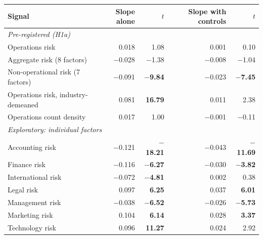 \begin{tabular}{lrrrr}
\toprule
Signal & Slope alone & $t$ & Slope with controls & $t$ \\
\midrule
\multicolumn{5}{l}{\textit{Pre-registered (H1a)}} \\
Operations risk & 0.018 & 1.08 & 0.001 & 0.10 \\
Aggregate risk (8 factors) & \ensuremath{-}0.028 & \ensuremath{-}1.38 & \ensuremath{-}0.008 & \ensuremath{-}1.04 \\
Non-operational risk (7 factors) & \ensuremath{-}0.091 & \textbf{\ensuremath{-}9.84} & \ensuremath{-}0.023 & \textbf{\ensuremath{-}7.45} \\
Operations risk, industry-demeaned & 0.081 & \textbf{16.79} & 0.011 & 2.38 \\
Operations count density & 0.017 & 1.00 & \ensuremath{-}0.001 & \ensuremath{-}0.11 \\
\midrule
\multicolumn{5}{l}{\textit{Exploratory: individual factors}} \\
Accounting risk & \ensuremath{-}0.121 & \textbf{\ensuremath{-}18.21} & \ensuremath{-}0.043 & \textbf{\ensuremath{-}11.69} \\
Finance risk & \ensuremath{-}0.116 & \textbf{\ensuremath{-}6.27} & \ensuremath{-}0.030 & \textbf{\ensuremath{-}3.82} \\
International risk & \ensuremath{-}0.072 & \textbf{\ensuremath{-}4.81} & 0.002 & 0.38 \\
Legal risk & 0.097 & \textbf{6.25} & 0.037 & \textbf{6.01} \\
Management risk & \ensuremath{-}0.038 & \textbf{\ensuremath{-}6.52} & \ensuremath{-}0.026 & \textbf{\ensuremath{-}5.73} \\
Marketing risk & 0.104 & \textbf{6.14} & 0.028 & \textbf{3.37} \\
Technology risk & 0.096 & \textbf{11.27} & 0.024 & 2.92 \\
\bottomrule
\end{tabular}
